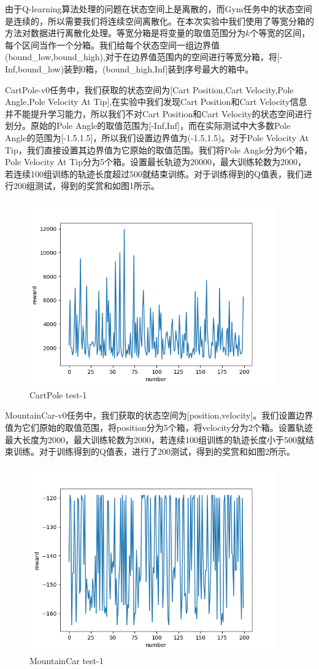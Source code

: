 \documentclass[a4paper,UTF8]{article}
\theoremstyle{definition}
\begin{document}
	由于Q-learning算法处理的问题在状态空间上是离散的，而Gym任务中的状态空间是连续的，所以需要我们将连续空间离散化。在本次实验中我们使用了等宽分箱的方法对数据进行离散化处理。等宽分箱是将变量的取值范围分为$k$个等宽的区间，每个区间当作一个分箱。我们给每个状态空间一组边界值(bound\_low,bound\_high),对于在边界值范围内的空间进行等宽分箱，将[-Inf,bound\_low)装到0箱，(bound\_high,Inf]装到序号最大的箱中。

	CartPole-v0任务中，我们获取的状态空间为[Cart Position,Cart Velocity,Pole Angle,Pole Velocity At Tip],在实验中我们发现Cart Position和Cart Velocity信息并不能提升学习能力，所以我们不对Cart Position和Cart Velocity的状态空间进行划分。原始的Pole Angle的取值范围为[-Inf,Inf]，而在实际测试中大多数Pole Angle的范围为[-1.5,1.5]，所以我们设置边界值为(-1.5,1.5)。对于Pole Velocity At Tip，我们直接设置其边界值为它原始的取值范围。我们将Pole Angle分为6个箱，Pole Velocity At Tip分为5个箱。设置最长轨迹为20000，最大训练轮数为2000，若连续100组训练的轨迹长度超过500就结束训练。对于训练得到的Q值表，我们进行200组测试，得到的奖赏和如图1所示。
\begin{figure}[!h]
\centering
\small
\includegraphics[height=8cm]{CartPole-1.png}
\caption{CartPole test-1}
\end{figure}

	MountainCar-v0任务中，我们获取的状态空间为[position,velocity]。我们设置边界值为它们原始的取值范围，将position分为5个箱，将velocity分为2个箱。设置轨迹最大长度为2000，最大训练轮数为2000，若连续100组训练的轨迹长度小于500就结束训练。对于训练得到的Q值表，进行了200测试，得到的奖赏和如图2所示。 
\begin{figure}[!h]
\centering
\small
\includegraphics[height=8cm]{MountainCar-1.png}
\caption{MountainCar test-1}
\end{figure}
\end{document}
